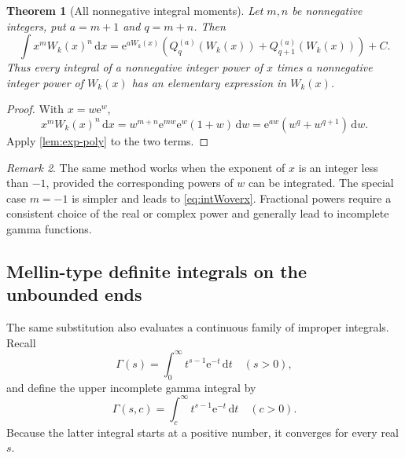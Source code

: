 \documentclass[11pt]{article}
\newtheorem{theorem}{Theorem}[section]
\theoremstyle{remark}
\newtheorem{remark}[theorem]{Remark}
\newcommand{\ee}{\mathrm e}
\newcommand{\dd}{\,\mathrm d}
\begin{document}
\begin{theorem}[All nonnegative integral moments]\label{thm:moments}
Let \(m,n\) be nonnegative integers, put \(a=m+1\) and \(q=m+n\).
Then
\begin{equation}\label{eq:momentformula}
 \int x^m W_k(x)^n\dd x
 =\ee^{aW_k(x)}
 \left(
  Q_q^{(a)}(W_k(x))
  +Q_{q+1}^{(a)}(W_k(x))
 \right)+C.
\end{equation}
Thus every integral of a nonnegative integer power of \(x\) times a
nonnegative integer power of \(W_k(x)\) has an elementary expression in
\(W_k(x)\).
\end{theorem}

\begin{proof}
With \(x=w\ee^w\),
\[
 x^mW_k(x)^n\dd x
 =w^{m+n}\ee^{mw}\ee^w(1+w)\dd w
 =\ee^{aw}(w^q+w^{q+1})\dd w.
\]
Apply \cref{lem:exp-poly} to the two terms.
\end{proof}

\begin{remark}
The same method works when the exponent of \(x\) is an integer less than
\(-1\), provided the corresponding powers of \(w\) can be integrated.
The special case \(m=-1\) is simpler and leads to
\eqref{eq:intWoverx}.  Fractional powers require a consistent choice of
the real or complex power and generally lead to incomplete gamma functions.
\end{remark}


\subsection{Mellin-type definite integrals on the unbounded ends}

The same substitution also evaluates a continuous family of improper
integrals.  Recall
\[
 \Gamma(s)=\int_0^\infty t^{s-1}\ee^{-t}\dd t
 \quad(s>0),
\]
and define the upper incomplete gamma integral by
\[
 \Gamma(s,c)=\int_c^\infty t^{s-1}\ee^{-t}\dd t
 \quad(c>0).
\]
Because the latter integral starts at a positive number, it converges for
every real \(s\).
\end{document}
